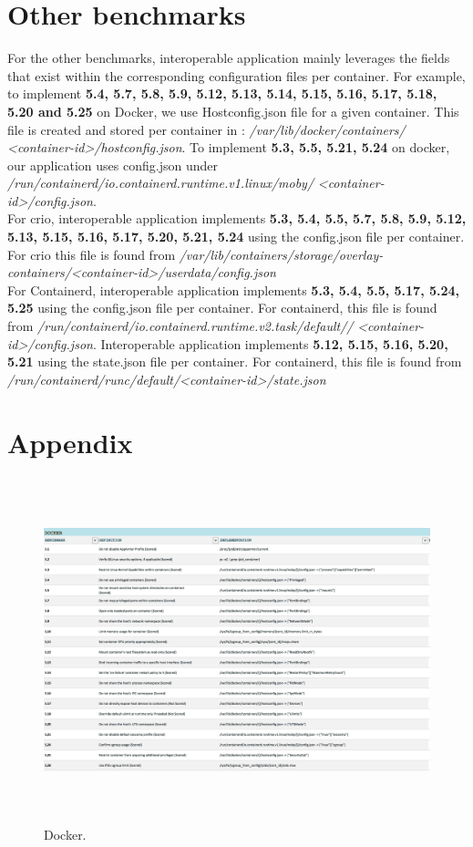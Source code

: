 \documentclass[times, twoside, watermark]{zHenriquesLab-StyleBioRxiv}
\begin{document}
\section*{Other benchmarks}
For the other benchmarks, interoperable application mainly leverages the fields that exist within the corresponding configuration files per container. For example,
to implement \textbf{5.4, 5.7, 5.8, 5.9, 5.12, 5.13, 5.14, 5.15, 5.16, 5.17, 5.18, 5.20 and 5.25} on Docker, we use Hostconfig.json file for a given container. This file
is created and stored per container in : \textit{/var/lib/docker/containers/} \textit{<container-id>/hostconfig.json}. To implement \textbf{5.3, 5.5, 5.21, 5.24} on docker, our application uses config.json under \textit{/run/containerd/io.containerd.runtime.v1.linux/moby/} \textit{<container-id>/config.json}.
\\

For crio, interoperable application implements \textbf{5.3, 5.4, 5.5, 5.7, 5.8, 5.9, 5.12, 5.13, 5.15, 5.16, 5.17, 5.20, 5.21, 5.24} using the config.json file per container. For crio this file is found from \textit{/var/lib/containers/storage/overlay-containers/}\textit{<container-id>/userdata/config.json}
\\

For Containerd, interoperable application implements \textbf{5.3, 5.4, 5.5, 5.17, 5.24, 5.25} using the config.json file per container.
For containerd, this file is found from \textit{/run/containerd/io.containerd.runtime.v2.task/default//} \textit{<container-id>/config.json}.
Interoperable application implements \textbf{5.12, 5.15, 5.16, 5.20, 5.21} using the state.json file per container.
For containerd, this file is found from \textit{/run/containerd/runc/default/}\textit{<container-id>/state.json}
\section*{Appendix}

\begin{figure}
    \caption{Docker.}
    \centering
      \includegraphics[width=\textwidth,height=10cm]{figures/docker}
  \end{figure}
\end{document}
